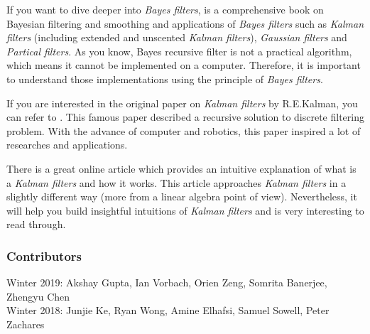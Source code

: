 \documentclass[twoside]{article}
\begin{document}
If you want to dive deeper into \textit{Bayes filters}, \cite{sarkka2013bayesian} is a comprehensive book on Bayesian filtering and smoothing and applications of \textit{Bayes filters} such as \textit{Kalman filters} (including extended and unscented \textit{Kalman filters}), \textit{Gaussian filters} and \textit{Partical filters}. As you know, Bayes recursive filter is not a practical algorithm, which means it cannot be implemented on a computer. Therefore, it is important to understand those implementations using the principle of \textit{Bayes filters}. 

If you are interested in the original paper on \textit{Kalman filters} by R.E.Kalman, you can refer to \cite{kalman1960new}. This famous paper described a recursive solution to discrete filtering problem. With the advance of computer and robotics, this paper inspired a lot of researches and applications. 

There is a great online article \cite{HowKF} which provides an intuitive explanation of what is a \textit{Kalman filters} and how it works. This article approaches \textit{Kalman filters} in a slightly different way (more from a linear algebra point of view). Nevertheless, it will help you build insightful intuitions of \textit{Kalman filters} and is very interesting to read through.





\subsubsection*{Contributors}
Winter 2019: Akshay Gupta, Ian Vorbach, Orien Zeng, Somrita Banerjee, Zhengyu Chen
\\
Winter 2018: Junjie Ke, Ryan Wong, Amine Elhafsi, Samuel Sowell, Peter Zachares
\end{document}
